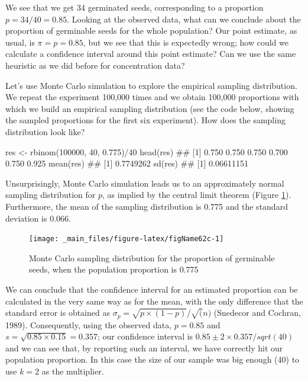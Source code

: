 \documentclass[a4paper,12pt,oneside]{book}
\newenvironment{Shaded}{\begin{snugshade}}{\end{snugshade}}
\newcommand{\DecValTok}[1]{#1}
\newcommand{\FloatTok}[1]{#1}
\newcommand{\SpecialCharTok}[1]{#1}
\newcommand{\DocumentationTok}[1]{#1}
\newcommand{\OtherTok}[1]{#1}
\newcommand{\FunctionTok}[1]{#1}
\newcommand{\NormalTok}[1]{#1}
\begin{document}
We see that we get 34 germinated seeds, corresponding to a proportion \(p = 34/40 = 0.85\). Looking at the observed data, what can we conclude about the proportion of germinable seeds for the whole population? Our point estimate, as usual, is \(\pi = p = 0.85\), but we see that this is expectedly wrong; how could we calculate a confidence interval around this point estimate? Can we use the same heuristic as we did before for concentration data?

Let's use Monte Carlo simulation to explore the empirical sampling distribution. We repeat the experiment 100,000 times and we obtain 100,000 proportions with which we build an empirical sampling distribution (see the code below, showing the sampled proportions for the first six experiment). How does the sampling distribution look like?

\begin{Shaded}
\begin{Highlighting}[]
\NormalTok{res }\OtherTok{\textless{}{-}} \FunctionTok{rbinom}\NormalTok{(}\DecValTok{100000}\NormalTok{, }\DecValTok{40}\NormalTok{, }\FloatTok{0.775}\NormalTok{)}\SpecialCharTok{/}\DecValTok{40}
\FunctionTok{head}\NormalTok{(res)}
\DocumentationTok{\#\# [1] 0.750 0.750 0.750 0.700 0.750 0.925}
\FunctionTok{mean}\NormalTok{(res)}
\DocumentationTok{\#\# [1] 0.7749262}
\FunctionTok{sd}\NormalTok{(res)}
\DocumentationTok{\#\# [1] 0.06611151}
\end{Highlighting}
\end{Shaded}

Unsurprisingly, Monte Carlo simulation leads us to an approximately normal sampling distribution for \(p\), as implied by the central limit theorem (Figure \ref{fig:figName62c}). Furthermore, the mean of the sampling distribution is 0.775 and the standard deviation is 0.066.

\begin{figure}

{\centering \texttt{[image: \_main\_files/figure-latex/figName62c-1]} 

}

\caption{Monte Carlo sampling distribution for the proportion of germinable seeds, when the population proportion is 0.775}\label{fig:figName62c}
\end{figure}

We can conclude that the confidence interval for an estimated proportion can be calculated in the very same way as for the mean, with the only difference that the standard error is obtained as \(\sigma_p = \sqrt{p \times (1 - p)}/\sqrt(n)\) (Snedecor and Cochran, 1989). Consequently, using the observed data, \(p = 0.85\) and \(s = \sqrt{0.85 \times 0.15} = 0.357\); our confidence interval is \(0.85 \pm 2 \times 0.357/sqrt(40)\) and we can see that, by reporting such an interval, we have correctly hit our population proportion. In this case the size of our sample was big enough (40) to use \(k = 2\) as the multiplier.
\end{document}
